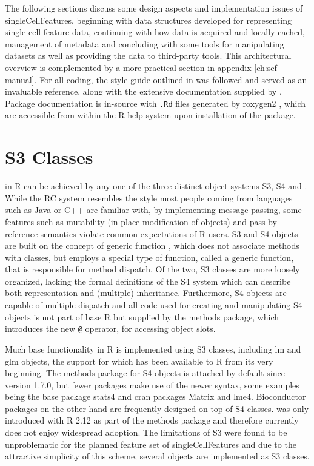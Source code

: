 The following sections discuss some design aspects and implementation issues of singleCellFeatures, beginning with data structures developed for representing single cell feature data, continuing with how data is acquired and locally cached, management of metadata and concluding with some tools for manipulating datasets as well as providing the data to third-party tools. This architectural overview is complemented by a more practical section in appendix \ref{ch:scf-manual}. For all coding, the style guide outlined in \citet{Wickham2014} was followed and \citet{Wickham2015} served as an invaluable reference, along with the extensive documentation supplied by \citet{RCoreTeam2015}. Package documentation is in-source with \texttt{.Rd} files generated by roxygen2 \citep{Wickham2015a}, which are accessible from within the R help system upon installation of the package.

\section{S3 Classes}
\label{sec:s3-objects}
 in R can be achieved by any one of the three distinct object systems S3, S4 and . While the RC system resembles the  style most people coming from languages such as Java or C++ are familiar with, by implementing message-passing, some features such as mutability (in-place modification of objects) and pass-by-reference semantics violate common expectations of R users. S3 and S4 objects are built on the concept of generic function , which does not associate methods with classes, but employs a special type of function, called a generic function, that is responsible for method dispatch. Of the two, S3 classes are more loosely organized, lacking the formal definitions of the S4 system which can describe both representation and (multiple) inheritance. Furthermore, S4 objects are capable of multiple dispatch and all code used for creating and manipulating S4 objects is not part of base R but supplied by the methods package, which introduces the new \texttt{@} operator, for accessing object slots.

Much base functionality in R is implemented using S3 classes, including lm and glm objects, the support for which has been available to R from its very beginning. The methods package for S4 objects is attached by default since version 1.7.0, but fewer packages make use of the newer syntax, some examples being the base package stats4 and \acrshort{cran} packages Matrix and lme4. Bioconductor packages on the other hand are frequently designed on top of S4 classes.  was only introduced with R 2.12 as part of the methods package and therefore currently does not enjoy widespread adoption. The limitations of S3 were found to be unproblematic for the planned feature set of singleCellFeatures and due to the attractive simplicity of this scheme, several objects are implemented as S3 classes.

